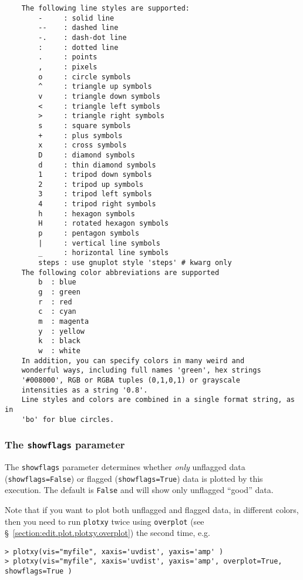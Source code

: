 \small
\begin{verbatim}
    The following line styles are supported:
        -     : solid line
        --    : dashed line
        -.    : dash-dot line
        :     : dotted line
        .     : points
        ,     : pixels
        o     : circle symbols
        ^     : triangle up symbols
        v     : triangle down symbols
        <     : triangle left symbols
        >     : triangle right symbols
        s     : square symbols
        +     : plus symbols
        x     : cross symbols
        D     : diamond symbols
        d     : thin diamond symbols
        1     : tripod down symbols
        2     : tripod up symbols
        3     : tripod left symbols
        4     : tripod right symbols
        h     : hexagon symbols
        H     : rotated hexagon symbols
        p     : pentagon symbols
        |     : vertical line symbols
        _     : horizontal line symbols
        steps : use gnuplot style 'steps' # kwarg only
    The following color abbreviations are supported
        b  : blue
        g  : green
        r  : red
        c  : cyan
        m  : magenta
        y  : yellow
        k  : black
        w  : white
    In addition, you can specify colors in many weird and
    wonderful ways, including full names 'green', hex strings
    '#008000', RGB or RGBA tuples (0,1,0,1) or grayscale
    intensities as a string '0.8'.
    Line styles and colors are combined in a single format string, as in
    'bo' for blue circles.
\end{verbatim}
\normalsize

\subsubsection{ The {\tt showflags} parameter}
\label{section:edit.plot.plotxy.showflags}

The {\tt showflags} parameter determines whether {\em only} unflagged
data ({\tt showflags=False}) or flagged ({\tt showflags=True}) data is
plotted by this execution.  The default is {\tt False} and will show
only unflagged ``good'' data.

Note that if you want to plot both unflagged and flagged data, in
different colors, then you need to run {\tt plotxy} twice using
{\tt overplot} (see \S~\ref{section:edit.plot.plotxy.overplot}) 
the second time, e.g.
\small
\begin{verbatim}
> plotxy(vis="myfile", xaxis='uvdist', yaxis='amp' )
> plotxy(vis="myfile", xaxis='uvdist', yaxis='amp', overplot=True, showflags=True )
\end{verbatim}
\normalsize

